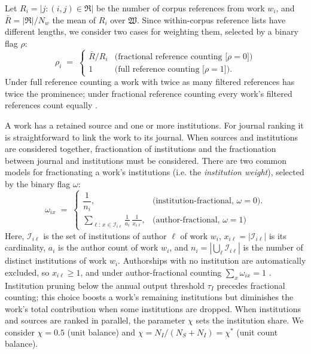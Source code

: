 Let $R_i = |{j : (i,j)\in\mathfrak{R}}|$ be the number of corpus references from work $w_i$, and $\bar{R} = |\mathfrak{R}|/N_w$ the mean of $R_i$ over $\mathfrak{W}$. Since within-corpus reference lists have different lengths, we consider two cases for weighting them, selected by a binary flag $\rho$:
\begin{equation}
	\rho_i \;=\;
	\begin{cases}
		\bar{R}/R_i & \text{(fractional reference counting [$\rho=0$])} \\
		1 & \text{(full reference counting [$\rho=1$])}.
	\end{cases}
	\label{eq:rho}
\end{equation}
Under full reference counting a work with twice as many filtered references has twice
the prominence; under fractional reference counting every work's filtered references count
equally \citep{zittModifyingJournalImpact2008}.

A work has a retained source and one or more institutions. For journal ranking it is straightforward to link the work to its journal. When sources and institutions are considered together, fractionation of institutions and the fractionation between journal and institutions must be considered. 
There are two common models for fractionating a work's institutions (i.e. the \textit{institution weight}), selected by the binary flag $\omega$:
\begin{equation}
  \omega_{ix} \;=\;
  \begin{cases}

    \dfrac{1}{n_i}, & \text{(institution-fractional, $\omega=0$).} \\[10pt]

	\displaystyle\sum_{\ell:\,x\in\mathcal{I}_{i\ell}}
    \frac{1}{a_i}\,\frac{1}{x_{i\ell}}, & \text{(author-fractional, $\omega=1$)} 
 
	\end{cases}
  \label{eq:omega}
\end{equation}
Here, $\mathcal{I}_{i\ell}$ is the set of institutions of author $\ell$ of work $w_i$, $x_{i\ell}=|\mathcal{I}_{i\ell}|$ is its cardinality, $a_i$ is the author count of work $w_i$, and $n_i = |\bigcup_\ell \mathcal{I}_{i\ell}|$ is the number of distinct institutions of work $w_i$. Authorships with no institution are automatically excluded, so $x_{i\ell}\ge 1$, and under author-fractional counting $\sum_x\omega_{ix}=1$ \citep{waltmanFieldnormalizedCitationImpact2015}. Institution pruning below the annual output threshold $\tau_I$ precedes fractional counting; this choice boosts a work's remaining institutions but diminishes the work's total contribution when some institutions are dropped.
When institutions and sources are ranked in parallel, the parameter $\chi$ sets the institution share. We consider $\chi = 0.5$ (unit balance) and $\chi=N_I/(N_S+N_I) = \chi^*$ (unit count balance).

